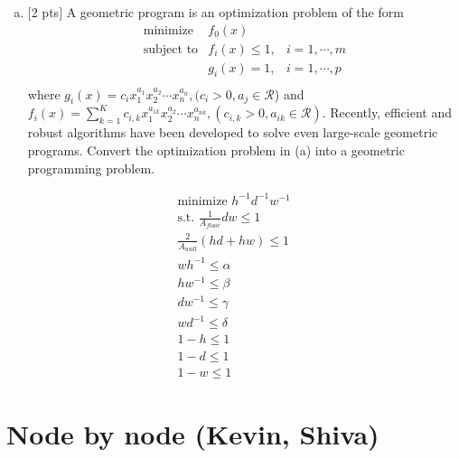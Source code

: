 \documentclass[12pt]{article}
\begin{document}
\begin{enumerate}[(b)]
\item $[$2 pts$]$ A geometric program is an optimization problem of the form
\begin{eqnarray*}
\text{minimize} & f_{0}(x) &\\
\text{subject to} & f_{i}(x) \leq 1, & i=1,\cdots,m\\
 & g_{i}(x) = 1, & i=1,\cdots,p\\
\end{eqnarray*}
where $g_{i}(x) = c_{i}x_{1}^{a_{1}}x_{2}^{a_{2}}\cdots x_{n}^{a_{n}}, (c_{i}>0, a_{j}\in \mathcal{R}$) and $f_{i}(x) = \sum_{k=1}^{K}c_{i,k}x_{1}^{a_{1k}}x_{2}^{a_{2}}\cdots x_{n}^{a_{nk}}, (c_{i,k}>0, a_{ik}\in \mathcal{R})$. Recently, efficient and robust algorithms have been developed to solve even large-scale geometric programs. Convert the optimization problem in (a) into a geometric programming problem.
\end{enumerate}

\begin{align*}
\text{minimize } h^{-1}d^{-1}w^{-1} \\
\text{s.t. } \frac{1}{A_{floor}}dw \leq 1 \\
\frac{2}{A_{wall}}(hd+hw)  \leq 1 \\
wh^{-1} \leq \alpha \\
hw^{-1} \leq \beta \\
dw^{-1} \leq \gamma \\
wd^{-1} \leq \delta \\
1-h \leq 1 \\
1-d \leq 1 \\
1-w \leq 1
\end{align*}
\vspace{.25cm}


\newpage
\clearpage


\section{Node by node (Kevin, Shiva)}
\end{document}
